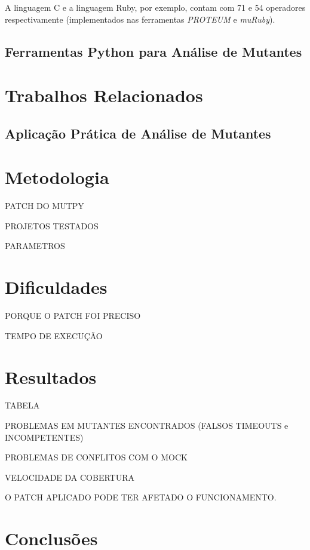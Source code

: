 \documentclass[12pt]{article}
\begin{document}
A linguagem C e a linguagem Ruby, por exemplo, contam com 71 \cite{Delamaro:1996} e 
54 operadores respectivamente \cite{Li:2015} (implementados nas 
ferramentas \textit{PROTEUM} e \textit{muRuby}).

\subsection{Ferramentas Python para Análise de Mutantes}




\section{Trabalhos Relacionados}

\subsection{Aplicação Prática de Análise de Mutantes}

\section{Metodologia}

PATCH DO MUTPY

PROJETOS TESTADOS

PARAMETROS

\section{Dificuldades}

PORQUE O PATCH FOI PRECISO

TEMPO DE EXECUÇÃO

\section{Resultados}

TABELA

PROBLEMAS EM MUTANTES ENCONTRADOS (FALSOS TIMEOUTS e INCOMPETENTES)

PROBLEMAS DE CONFLITOS COM O MOCK

VELOCIDADE DA COBERTURA


O PATCH APLICADO PODE TER AFETADO O FUNCIONAMENTO.

\section{Conclusões}
\end{document}
